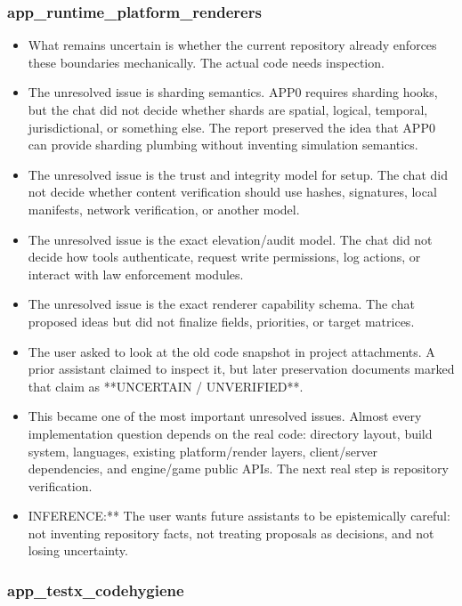 \documentclass[11pt,a4paper]{report}
\begin{document}
\subsubsection{app\_runtime\_platform\_renderers}

\begin{itemize}
\item What remains uncertain is whether the current repository already enforces these boundaries mechanically. The actual code needs inspection.
\item The unresolved issue is sharding semantics. APP0 requires sharding hooks, but the chat did not decide whether shards are spatial, logical, temporal, jurisdictional, or something else. The report preserved the idea that APP0 can provide sharding plumbing without inventing simulation semantics.
\item The unresolved issue is the trust and integrity model for setup. The chat did not decide whether content verification should use hashes, signatures, local manifests, network verification, or another model.
\item The unresolved issue is the exact elevation/audit model. The chat did not decide how tools authenticate, request write permissions, log actions, or interact with law enforcement modules.
\item The unresolved issue is the exact renderer capability schema. The chat proposed ideas but did not finalize fields, priorities, or target matrices.
\item The user asked to look at the old code snapshot in project attachments. A prior assistant claimed to inspect it, but later preservation documents marked that claim as **UNCERTAIN / UNVERIFIED**.
\item This became one of the most important unresolved issues. Almost every implementation question depends on the real code: directory layout, build system, languages, existing platform/render layers, client/server dependencies, and engine/game public APIs. The next real step is repository verification.
\item INFERENCE:** The user wants future assistants to be epistemically careful: not inventing repository facts, not treating proposals as decisions, and not losing uncertainty.
\end{itemize}

\subsubsection{app\_testx\_codehygiene}
\end{document}
